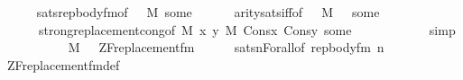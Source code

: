 \begin{isabellebody}
\ \ \ \ \isamarkupfalse%
\ sats{\isacharunderscore}{\kern0pt}rep{\isacharunderscore}{\kern0pt}body{\isacharunderscore}{\kern0pt}fm{\isacharbrackleft}{\kern0pt}of\ {\isasymphi}\ {\isachardoublequoteopen}{\isacharbrackleft}{\kern0pt}{\isacharbrackright}{\kern0pt}{\isachardoublequoteclose}\ M\ some{\isacharbrackright}{\kern0pt}\isanewline
\ \ \ \ \ \ arity{\isacharunderscore}{\kern0pt}sats{\isacharunderscore}{\kern0pt}iff{\isacharbrackleft}{\kern0pt}of\ {\isasymphi}\ {\isacharunderscore}{\kern0pt}\ M\ {\isachardoublequoteopen}{\isacharbrackleft}{\kern0pt}{\isacharunderscore}{\kern0pt}{\isacharcomma}{\kern0pt}{\isacharunderscore}{\kern0pt}{\isacharbrackright}{\kern0pt}\ {\isacharat}{\kern0pt}\ some{\isachardoublequoteclose}{\isacharbrackright}{\kern0pt}\isanewline
\ \ \ \ \ \ strong{\isacharunderscore}{\kern0pt}replacement{\isacharunderscore}{\kern0pt}cong{\isacharbrackleft}{\kern0pt}of\ {\isachardoublequoteopen}{\isacharhash}{\kern0pt}{\isacharhash}{\kern0pt}M{\isachardoublequoteclose}\ {\isachardoublequoteopen}{\isasymlambda}x\ y{\isachardot}{\kern0pt}\ M{\isacharcomma}{\kern0pt}\ Cons{\isacharparenleft}{\kern0pt}x{\isacharcomma}{\kern0pt}\ Cons{\isacharparenleft}{\kern0pt}y{\isacharcomma}{\kern0pt}\ some\ {\isacharat}{\kern0pt}\ {\isacharunderscore}{\kern0pt}{\isacharparenright}{\kern0pt}{\isacharparenright}{\kern0pt}\ {\isasymTurnstile}\ {\isasymphi}{\isachardoublequoteclose}\ {\isacharunderscore}{\kern0pt}\ {\isacharbrackright}{\kern0pt}\isanewline
\ \ \ \ \isamarkupfalse%
\ simp\isanewline
\ \ \isacommand{{\isacharbraceright}{\kern0pt}}\isamarkupfalse%
\isanewline
\ \ \isamarkupfalse%
\ {\isacartoucheopen}{\isasymphi}{\isasymin}{\isacharunderscore}{\kern0pt}{\isacartoucheclose}\isanewline
\ \ \isamarkupfalse%
\ {\isachardoublequoteopen}M{\isacharcomma}{\kern0pt}\ {\isacharbrackleft}{\kern0pt}{\isacharbrackright}{\kern0pt}\ {\isasymTurnstile}\ ZF{\isacharunderscore}{\kern0pt}replacement{\isacharunderscore}{\kern0pt}fm{\isacharparenleft}{\kern0pt}{\isasymphi}{\isacharparenright}{\kern0pt}{\isachardoublequoteclose}\isanewline
\ \ \ \ \isamarkupfalse%
\ sats{\isacharunderscore}{\kern0pt}nForall{\isacharbrackleft}{\kern0pt}of\ {\isachardoublequoteopen}rep{\isacharunderscore}{\kern0pt}body{\isacharunderscore}{\kern0pt}fm{\isacharparenleft}{\kern0pt}{\isasymphi}{\isacharparenright}{\kern0pt}{\isachardoublequoteclose}\ {\isacharquery}{\kern0pt}n{\isacharbrackright}{\kern0pt}\isanewline
\ \ \ \ \isamarkupfalse%
\ ZF{\isacharunderscore}{\kern0pt}replacement{\isacharunderscore}{\kern0pt}fm{\isacharunderscore}{\kern0pt}def\isanewline

\end{isabellebody}
